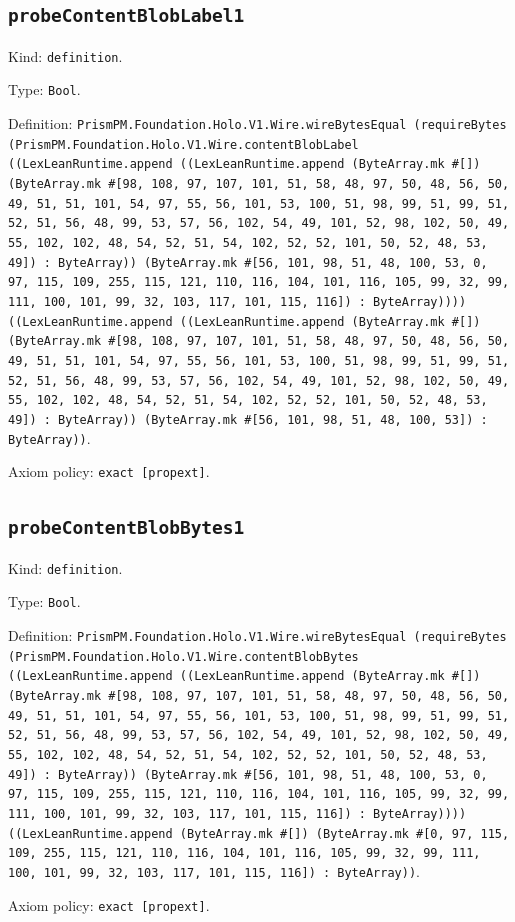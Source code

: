 \documentclass[11pt]{article}
\begin{document}
\subsection*{\texttt{probeContentBlobLabel1}}
\noindent Kind: \texttt{definition}.\par
\noindent Type: \texttt{Bool}.\par
\noindent Definition: \texttt{PrismPM.Foundation.Holo.V1.Wire.wireBytesEqual (requireBytes (PrismPM.Foundation.Holo.V1.Wire.contentBlobLabel ((LexLeanRuntime.append ((LexLeanRuntime.append (ByteArray.mk \#[]) (ByteArray.mk \#[98, 108, 97, 107, 101, 51, 58, 48, 97, 50, 48, 56, 50, 49, 51, 51, 101, 54, 97, 55, 56, 101, 53, 100, 51, 98, 99, 51, 99, 51, 52, 51, 56, 48, 99, 53, 57, 56, 102, 54, 49, 101, 52, 98, 102, 50, 49, 55, 102, 102, 48, 54, 52, 51, 54, 102, 52, 52, 101, 50, 52, 48, 53, 49]) : ByteArray)) (ByteArray.mk \#[56, 101, 98, 51, 48, 100, 53, 0, 97, 115, 109, 255, 115, 121, 110, 116, 104, 101, 116, 105, 99, 32, 99, 111, 100, 101, 99, 32, 103, 117, 101, 115, 116]) : ByteArray)))) ((LexLeanRuntime.append ((LexLeanRuntime.append (ByteArray.mk \#[]) (ByteArray.mk \#[98, 108, 97, 107, 101, 51, 58, 48, 97, 50, 48, 56, 50, 49, 51, 51, 101, 54, 97, 55, 56, 101, 53, 100, 51, 98, 99, 51, 99, 51, 52, 51, 56, 48, 99, 53, 57, 56, 102, 54, 49, 101, 52, 98, 102, 50, 49, 55, 102, 102, 48, 54, 52, 51, 54, 102, 52, 52, 101, 50, 52, 48, 53, 49]) : ByteArray)) (ByteArray.mk \#[56, 101, 98, 51, 48, 100, 53]) : ByteArray))}.\par
\noindent Axiom policy: \texttt{exact [propext]}.\par
\subsection*{\texttt{probeContentBlobBytes1}}
\noindent Kind: \texttt{definition}.\par
\noindent Type: \texttt{Bool}.\par
\noindent Definition: \texttt{PrismPM.Foundation.Holo.V1.Wire.wireBytesEqual (requireBytes (PrismPM.Foundation.Holo.V1.Wire.contentBlobBytes ((LexLeanRuntime.append ((LexLeanRuntime.append (ByteArray.mk \#[]) (ByteArray.mk \#[98, 108, 97, 107, 101, 51, 58, 48, 97, 50, 48, 56, 50, 49, 51, 51, 101, 54, 97, 55, 56, 101, 53, 100, 51, 98, 99, 51, 99, 51, 52, 51, 56, 48, 99, 53, 57, 56, 102, 54, 49, 101, 52, 98, 102, 50, 49, 55, 102, 102, 48, 54, 52, 51, 54, 102, 52, 52, 101, 50, 52, 48, 53, 49]) : ByteArray)) (ByteArray.mk \#[56, 101, 98, 51, 48, 100, 53, 0, 97, 115, 109, 255, 115, 121, 110, 116, 104, 101, 116, 105, 99, 32, 99, 111, 100, 101, 99, 32, 103, 117, 101, 115, 116]) : ByteArray)))) ((LexLeanRuntime.append (ByteArray.mk \#[]) (ByteArray.mk \#[0, 97, 115, 109, 255, 115, 121, 110, 116, 104, 101, 116, 105, 99, 32, 99, 111, 100, 101, 99, 32, 103, 117, 101, 115, 116]) : ByteArray))}.\par
\noindent Axiom policy: \texttt{exact [propext]}.\par
\end{document}
